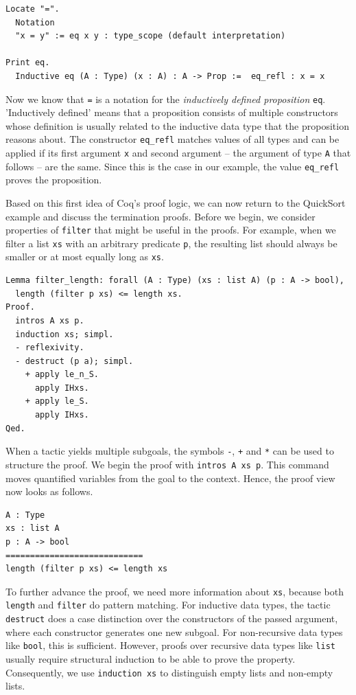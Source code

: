 \documentclass[a4paper, 11pt, fleqn, twoside]{scrreprt}
\newcommand{\cinl}[1]{\texttt{#1}}
\begin{document}
\begin{verbatim}
Locate "=".
  Notation
  "x = y" := eq x y : type_scope (default interpretation)

Print eq.
  Inductive eq (A : Type) (x : A) : A -> Prop :=  eq_refl : x = x
\end{verbatim}

Now we know that \cinl{=} is a notation for the \textit{inductively defined proposition} \cinl{eq}.
'Inductively defined' means that a proposition consists of multiple constructors whose definition is usually related to the inductive data type that the proposition reasons about.
The constructor \cinl{eq_refl} matches values of all types and can be applied if its first argument \cinl{x} and second argument -- the argument of type \cinl{A} that follows -- are the same.
Since this is the case in our example, the value \cinl{eq_refl} proves the proposition.

Based on this first idea of Coq's proof logic, we can now return to the QuickSort example and discuss the termination proofs.
Before we begin, we consider properties of \cinl{filter} that might be useful in the proofs.
For example, when we filter a list \cinl{xs} with an arbitrary predicate \cinl{p}, the resulting list should always be smaller or at most equally long as \cinl{xs}.

\begin{verbatim}
Lemma filter_length: forall (A : Type) (xs : list A) (p : A -> bool),
  length (filter p xs) <= length xs.
Proof.
  intros A xs p.
  induction xs; simpl.
  - reflexivity.
  - destruct (p a); simpl.
    + apply le_n_S.
      apply IHxs.
    + apply le_S.
      apply IHxs.
Qed.
\end{verbatim}

When a tactic yields multiple subgoals, the symbols \cinl{-}, \cinl{+} and \cinl{*} can be used to structure the proof.
We begin the proof with \cinl{intros A xs p}. 
This command moves quantified variables from the goal to the context.
Hence, the proof view now looks as follows.

\begin{verbatim}
A : Type
xs : list A
p : A -> bool
============================
length (filter p xs) <= length xs
\end{verbatim}

To further advance the proof, we need more information about \cinl{xs}, because both \cinl{length} and \cinl{filter} do pattern matching.
For inductive data types, the tactic \cinl{destruct} does a case distinction over the constructors of the passed argument, where each constructor generates one new subgoal.
For non-recursive data types like \cinl{bool}, this is sufficient.
However, proofs over recursive data types like \cinl{list} usually require structural induction to be able to prove the property.
Consequently, we use \cinl{induction xs} to distinguish empty lists and non-empty lists.
\end{document}

